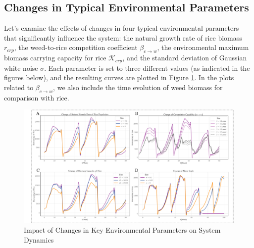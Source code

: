\documentclass{HZNUMCM}
\begin{document}
    \subsection{Changes in Typical Environmental Parameters}
      Let's examine the effects of changes in four typical environmental parameters that significantly influence the system: 
      the natural growth rate of rice biomass \( r_{crp} \), 
      the weed-to-rice competition coefficient \( \beta_{c\rightarrow w} \), 
      the environmental maximum biomass carrying capacity for rice \( \mathscr{K}_{crp} \), 
      and the standard deviation of Gaussian white noise \( \sigma \). 
      Each parameter is set to three different values (as indicated in the figures below), 
      and the resulting curves are plotted in Figure \ref{fig:Change_all}. 
      In the plots related to \( \beta_{c\rightarrow w} \), 
      we also include the time evolution of weed biomass for comparison with rice.

    \begin{figure}[ht]
      \centering
      \includegraphics[width=\linewidth]{images/Change_all.png}
      \caption{Impact of Changes in Key Environmental Parameters on System Dynamics}
      \label{fig:Change_all}
    \end{figure}
\end{document}

